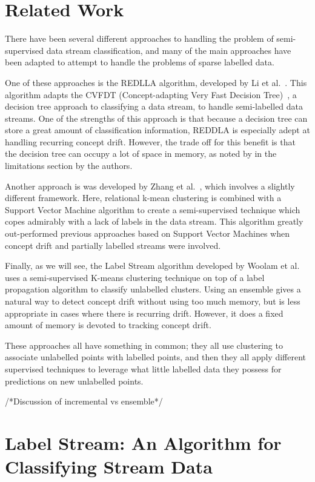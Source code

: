 \documentclass[12pt,a4paper,oneside]{report}
\begin{document}
\section*{Related Work}

There have been several different approaches to handling the problem of semi-supervised data stream classification, and many of the main approaches have been adapted to attempt to handle the problems of sparse labelled data. 

One of these approaches is the REDLLA algorithm, developed by Li et al.~\cite{Li}. This algorithm adapts the CVFDT (Concept-adapting Very Fast Decision Tree)~\cite{CVFDT}, a decision tree approach to classifying a data stream, to handle semi-labelled data streams. One of the strengths of this approach is that because a decision tree can store a great amount of classification information, REDDLA is especially adept at handling recurring concept drift. However, the trade off for this benefit is that the decision tree can occupy a lot of space in memory, as noted by in the limitations section by the authors. 

Another approach is was developed by Zhang et al.~\cite{Zhang}, which involves a slightly different framework. Here, relational k-mean clustering is combined with a Support Vector Machine algorithm to create a semi-supervised technique which copes admirably with a lack of labels in the data stream. This algorithm greatly out-performed previous approaches based on Support Vector Machines when concept drift and partially labelled streams were involved. 

Finally, as we will see, the Label Stream algorithm developed by Woolam et al.~\cite{LabStr} uses a semi-supervised K-means clustering technique on top of a label propagation algorithm to classify unlabelled clusters. Using an ensemble gives a natural way to detect concept drift without using too much memory, but is less appropriate in cases where there is recurring drift. However, it does a fixed amount of memory is devoted to tracking concept drift. 

These approaches all have something in common; they all use clustering to associate unlabelled points with labelled points, and then they all apply different supervised techniques to leverage what little labelled data they possess for predictions on new unlabelled points. 

/*Discussion of incremental vs ensemble*/
\section*{Label Stream: An Algorithm for Classifying Stream Data}
\end{document}
